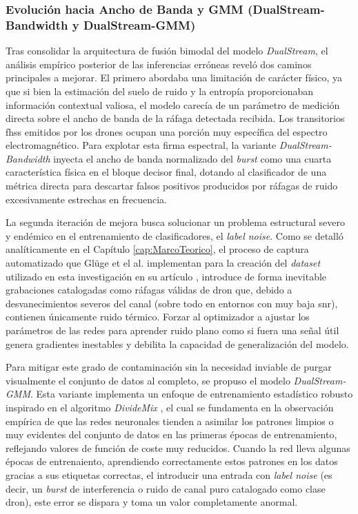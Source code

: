\subsubsection{Evolución hacia Ancho de Banda y GMM (DualStream-Bandwidth y DualStream-GMM)}
Tras consolidar la arquitectura de fusión bimodal del modelo \textit{DualStream}, el análisis empírico posterior de las inferencias erróneas reveló dos caminos principales a mejorar. El primero abordaba una limitación de carácter físico, ya que si bien la estimación del suelo de ruido y la entropía proporcionaban información contextual valiosa, el modelo carecía de un parámetro de medición directa sobre el ancho de banda de la ráfaga detectada recibida. Los transitorios \gls{fhss} emitidos por los drones ocupan una porción muy específica del espectro electromagnético. Para explotar esta firma espectral, la variante \textit{DualStream-Bandwidth} inyecta el ancho de banda normalizado del \textit{burst} como una cuarta característica física en el bloque decisor final, dotando al clasificador de una métrica directa para descartar falsos positivos producidos por ráfagas de ruido excesivamente estrechas en frecuencia.

La segunda iteración de mejora busca solucionar un problema estructural severo y endémico en el entrenamiento de clasificadores, el \textit{label noise}. Como se detalló analíticamente en el Capítulo \ref{cap:MarcoTeorico}, el proceso de captura automatizado que Glüge et el al. implementan para la creación del \textit{dataset} utilizado en esta investigación en su artículo \cite{gluge_robust_2024}, introduce de forma inevitable grabaciones catalogadas como ráfagas válidas de dron que, debido a desvanecimientos severos del canal (sobre todo en entornos con muy baja \gls{snr}), contienen únicamente ruido térmico. Forzar al optimizador a ajustar los parámetros de las redes para aprender ruido plano como si fuera una señal útil genera gradientes inestables y debilita la capacidad de generalización del modelo.

Para mitigar este grado de contaminación sin la necesidad inviable de purgar visualmente el conjunto de datos al completo, se propuso el modelo \textit{DualStream-GMM}. Esta variante implementa un enfoque de entrenamiento estadístico robusto inspirado en el algoritmo \textit{DivideMix} \cite{li_dividemix_2020}, el cual se fundamenta en la observación empírica de que las redes neuronales tienden a asimilar los patrones limpios o muy evidentes del conjunto de datos en las primeras épocas de entrenamiento, reflejando valores de función de coste muy reducidos. Cuando la red lleva algunas épocas de entrenaiento, aprendiendo correctamente estos patrones en los datos gracias a sus etiquetas correctas, el introducir una entrada con \textit{label noise} (es decir, un \textit{burst} de interferencia o ruido de canal puro catalogado como clase dron), este error se dispara y toma un valor completamente anormal.

